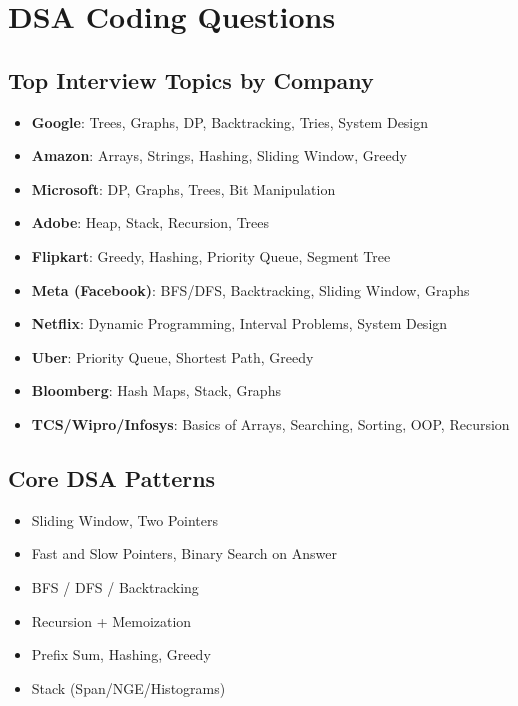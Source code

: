 \chapter{DSA Coding Questions}

\section*{Top Interview Topics by Company}
\begin{itemize}
  \item \textbf{Google}: Trees, Graphs, DP, Backtracking, Tries, System Design
  \item \textbf{Amazon}: Arrays, Strings, Hashing, Sliding Window, Greedy
  \item \textbf{Microsoft}: DP, Graphs, Trees, Bit Manipulation
  \item \textbf{Adobe}: Heap, Stack, Recursion, Trees
  \item \textbf{Flipkart}: Greedy, Hashing, Priority Queue, Segment Tree
  \item \textbf{Meta (Facebook)}: BFS/DFS, Backtracking, Sliding Window, Graphs
  \item \textbf{Netflix}: Dynamic Programming, Interval Problems, System Design
  \item \textbf{Uber}: Priority Queue, Shortest Path, Greedy
  \item \textbf{Bloomberg}: Hash Maps, Stack, Graphs
  \item \textbf{TCS/Wipro/Infosys}: Basics of Arrays, Searching, Sorting, OOP, Recursion
\end{itemize}

\section*{Core DSA Patterns}
\begin{itemize}
  \item Sliding Window, Two Pointers
  \item Fast and Slow Pointers, Binary Search on Answer
  \item BFS / DFS / Backtracking
  \item Recursion + Memoization
  \item Prefix Sum, Hashing, Greedy
  \item Stack (Span/NGE/Histograms)
\end{itemize}


